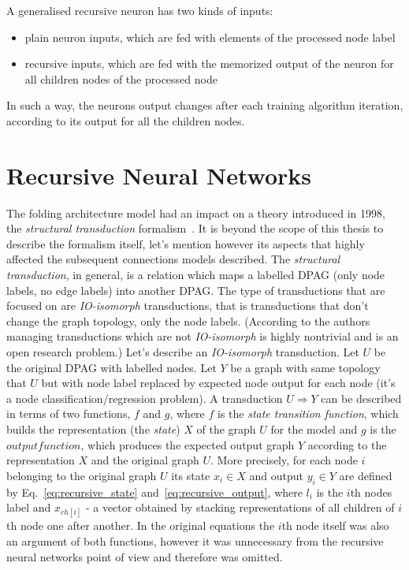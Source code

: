 \noindent A generalised recursive neuron has two kinds of inputs:
\begin{itemize}
\item plain neuron inputs, which are fed with elements of the processed node label
\item recursive inputs, which are fed with the memorized output of the neuron for all children nodes of the processed node
\end{itemize}

\noindent In such a way, the neurons output changes after each training algorithm iteration, according to its output for all the children nodes.

\section{Recursive Neural Networks}
The folding architecture model had an impact on a theory introduced in 1998, the \emph{structural transduction} formalism~\cite{frasconi1998general}. It is beyond the scope of this thesis to describe the formalism itself, let's mention however its aspects that highly affected the subsequent connections models described. The \emph{structural transduction}, in general, is a relation which maps a labelled DPAG (only node labels, no edge labels) into another DPAG. The type of transductions that are focused on are \emph{IO-isomorph} transductions, that is transductions that don't change the graph topology, only the node labels. (According to the authors managing transductions which are not \emph{IO-isomorph} is highly nontrivial and is an open research problem.) Let's describe an \emph{IO-isomorph} transduction. Let $U$ be the original DPAG with labelled nodes. Let $Y$ be a graph with same topology that $U$ but with node label replaced by expected node output for each node (it's a node classification/regression problem). A transduction $U \Rightarrow Y$ can be described in terms of two functions, $f$ and $g$, where $f$ is the \emph{state transition function}, which builds the representation (the \emph{state}) $X$ of the graph $U$ for the model and $g$ is the $output function$, which produces the expected output graph $Y$ according to the representation $X$ and the original graph $U$. More precisely, for each node $i$ belonging to the original graph $U$ its state $x_i \in X$ and output $y_i \in Y$ are defined by Eq.~\ref{eq:recursive_state} and~\ref{eq:recursive_output}, where $l_i$ is the $i$th nodes label and $x_{ch[i]}$ - a vector obtained by stacking representations of all children of $i$th node one after another. In the original equations the $i$th node itself was also an argument of both functions, however it was unnecessary from the recursive neural networks point of view and therefore was omitted. 

